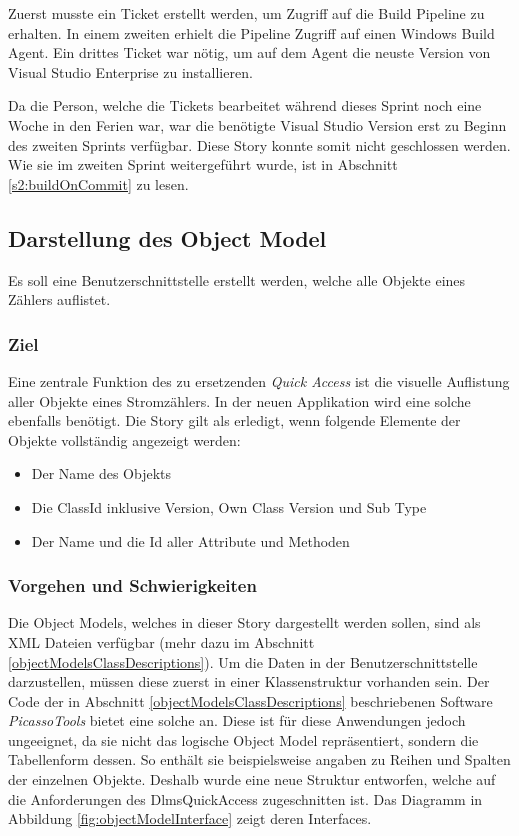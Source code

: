 Zuerst musste ein Ticket erstellt werden, um Zugriff auf die Build Pipeline zu erhalten.
In einem zweiten erhielt die Pipeline Zugriff auf einen Windows Build Agent.
Ein drittes Ticket war nötig, um auf dem Agent die neuste Version von Visual Studio Enterprise zu installieren.

Da die Person, welche die Tickets bearbeitet während dieses Sprint noch eine Woche in den Ferien war, war die benötigte Visual Studio Version erst zu Beginn des zweiten Sprints verfügbar.
Diese Story konnte somit nicht geschlossen werden.
Wie sie im zweiten Sprint weitergeführt wurde, ist in Abschnitt \ref{s2:buildOnCommit} zu lesen.


\subsection{Darstellung des Object Model}
\dq Es soll eine Benutzerschnittstelle erstellt werden, welche alle Objekte eines Zählers auflistet.\dq

\subsubsection{Ziel}
Eine zentrale Funktion des zu ersetzenden \textit{Quick Access} ist die visuelle Auflistung aller Objekte eines Stromzählers.
In der neuen Applikation wird eine solche ebenfalls benötigt.
Die Story gilt als erledigt, wenn folgende Elemente der Objekte vollständig angezeigt werden:
\begin{itemize}
   \item Der Name des Objekts
   \item Die ClassId inklusive Version, Own Class Version und Sub Type
   \item Der Name und die Id aller Attribute und Methoden
\end{itemize}

\subsubsection{Vorgehen und Schwierigkeiten}
Die Object Models, welches in dieser Story dargestellt werden sollen, sind als XML Dateien verfügbar (mehr dazu im Abschnitt \ref{objectModelsClassDescriptions}).
Um die Daten in der Benutzerschnittstelle darzustellen, müssen diese zuerst in einer Klassenstruktur vorhanden sein.
Der Code der in Abschnitt \ref{objectModelsClassDescriptions} beschriebenen Software \textit{PicassoTools} bietet eine solche an.
Diese ist für diese Anwendungen jedoch ungeeignet, da sie nicht das logische Object Model repräsentiert, sondern die Tabellenform dessen.
So enthält sie beispielsweise angaben zu Reihen und Spalten der einzelnen Objekte.
Deshalb wurde eine neue Struktur entworfen, welche auf die Anforderungen des DlmsQuickAccess zugeschnitten ist.
Das Diagramm in Abbildung \ref{fig:objectModelInterface} zeigt deren Interfaces.


